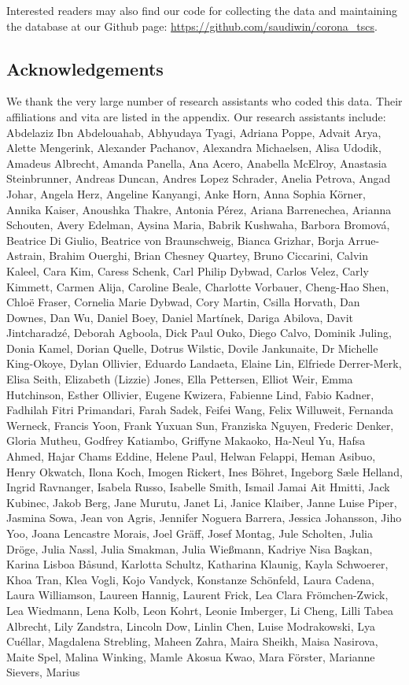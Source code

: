 \documentclass[]{article}
\begin{document}
Interested readers may also find our code for collecting the data and maintaining the database at our Github page: \url{https://github.com/saudiwin/corona_tscs}.

\hypertarget{acknowledgements}{%
\subsection*{Acknowledgements}\label{acknowledgements}}

We thank the very large number of research assistants who coded this data. Their affiliations and vita are listed in the appendix. Our research assistants include:
Abdelaziz Ibn Abdelouahab, Abhyudaya Tyagi, Adriana Poppe, Advait Arya, Alette Mengerink, Alexander Pachanov, Alexandra Michaelsen, Alisa Udodik, Amadeus Albrecht, Amanda Panella, Ana Acero, Anabella McElroy, Anastasia Steinbrunner, Andreas Duncan, Andres Lopez Schrader, Anelia Petrova, Angad Johar, Angela Herz, Angeline Kanyangi, Anke Horn, Anna Sophia Körner, Annika Kaiser, Anoushka Thakre, Antonia Pérez, Ariana Barrenechea, Arianna Schouten, Avery Edelman, Aysina Maria, Babrik Kushwaha, Barbora Bromová, Beatrice Di Giulio, Beatrice von Braunschweig, Bianca Grizhar, Borja Arrue-Astrain, Brahim Ouerghi, Brian Chesney Quartey, Bruno Ciccarini, Calvin Kaleel, Cara Kim, Caress Schenk, Carl Philip Dybwad, Carlos Velez, Carly Kimmett, Carmen Alija, Caroline Beale, Charlotte Vorbauer, Cheng-Hao Shen, Chloë Fraser, Cornelia Marie Dybwad, Cory Martin, Csilla Horvath, Dan Downes, Dan Wu, Daniel Boey, Daniel Martínek, Dariga Abilova, Davit Jintcharadzé, Deborah Agboola, Dick Paul Ouko, Diego Calvo, Dominik Juling, Donia Kamel, Dorian Quelle, Dotrus Wilstic, Dovile Jankunaite, Dr Michelle King-Okoye, Dylan Ollivier, Eduardo Landaeta, Elaine Lin, Elfriede Derrer-Merk, Elisa Seith, Elizabeth (Lizzie) Jones, Ella Pettersen, Elliot Weir, Emma Hutchinson, Esther Ollivier, Eugene Kwizera, Fabienne Lind, Fabio Kadner, Fadhilah Fitri Primandari, Farah Sadek, Feifei Wang, Felix Willuweit, Fernanda Werneck, Francis Yoon, Frank Yuxuan Sun, Franziska Nguyen, Frederic Denker, Gloria Mutheu, Godfrey Katiambo, Griffyne Makaoko, Ha-Neul Yu, Hafsa Ahmed, Hajar Chams Eddine, Helene Paul, Helwan Felappi, Heman Asibuo, Henry Okwatch, Ilona Koch, Imogen Rickert, Ines Böhret, Ingeborg Sæle Helland, Ingrid Ravnanger, Isabela Russo, Isabelle Smith, Ismail Jamai Ait Hmitti, Jack Kubinec, Jakob Berg, Jane Murutu, Janet Li, Janice Klaiber, Janne Luise Piper, Jasmina Sowa, Jean von Agris, Jennifer Noguera Barrera, Jessica Johansson, Jiho Yoo, Joana Lencastre Morais, Joel Gräff, Josef Montag, Jule Scholten, Julia Dröge, Julia Nassl, Julia Smakman, Julia Wießmann, Kadriye Nisa Başkan, Karina Lisboa Båsund, Karlotta Schultz, Katharina Klaunig, Kayla Schwoerer, Khoa Tran, Klea Vogli, Kojo Vandyck, Konstanze Schönfeld, Laura Cadena, Laura Williamson, Laureen Hannig, Laurent Frick, Lea Clara Frömchen-Zwick, Lea Wiedmann, Lena Kolb, Leon Kohrt, Leonie Imberger, Li Cheng, Lilli Tabea Albrecht, Lily Zandstra, Lincoln Dow, Linlin Chen, Luise Modrakowski, Lya Cuéllar, Magdalena Strebling, Maheen Zahra, Maira Sheikh, Maisa Nasirova, Maite Spel, Malina Winking, Mamle Akosua Kwao, Mara Förster, Marianne Sievers, Marius 
\end{document}

